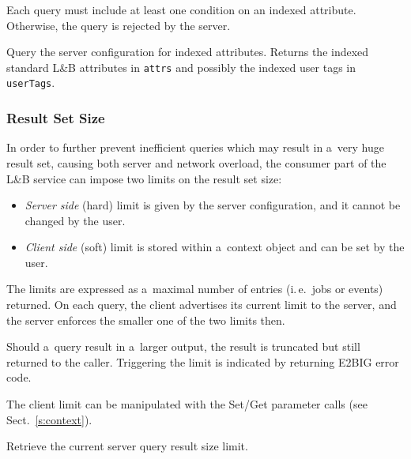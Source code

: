 \documentclass{egee}
\def\LB{L\&B\xspace}
\def\ie{i.\,e.\xspace}
\begin{document}
Each query must include at least one condition on an indexed attribute.
Otherwise, the query is rejected by the server.

\Synopsis
{}
\Description
Query the server configuration for indexed attributes.
Returns the indexed standard \LB attributes in \verb'attrs'
and possibly the indexed user tags in \verb'userTags'.

\subsubsection{Result Set Size}
In order to further prevent inefficient queries which may result in a~very huge
result set, causing both server and network overload, the consumer
part of the \LB service can impose two limits on the result set size:
\begin{itemize}
\item \emph{Server side} (hard) limit is given by the server configuration,
and it cannot be changed by the user.
\item \emph{Client side} (soft) limit is stored within a~context object
and can be set by the user.
\end{itemize}
The limits are expressed as a~maximal number of entries (\ie\ jobs or events)
returned. 
On each query, the client advertises its current limit to the server,
and the server enforces the smaller one of the two limits then.

Should a~query result in a~larger output, the result is truncated but still
returned to the caller.
Triggering the limit is indicated by returning E2BIG error code.

The client limit can be manipulated with the Set/Get parameter calls
(see Sect.~\ref{s:context}).

\Synopsis
{}

\Description
Retrieve the current server query result size limit.
\end{document}
